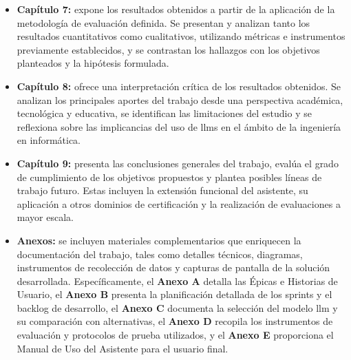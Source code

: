\begin{itemize}
\item \textbf{Capítulo 7:} expone los resultados obtenidos a partir de la aplicación de la metodología de evaluación definida. Se presentan y analizan tanto los resultados cuantitativos como cualitativos, utilizando métricas e instrumentos previamente establecidos, y se contrastan los hallazgos con los objetivos planteados y la hipótesis formulada.
\item \textbf{Capítulo 8:} ofrece una interpretación crítica de los resultados obtenidos. Se analizan los principales aportes del trabajo desde una perspectiva académica, tecnológica y educativa, se identifican las limitaciones del estudio y se reflexiona sobre las implicancias del uso de \glspl{llm} en el ámbito de la ingeniería en informática.
\item \textbf{Capítulo 9:} presenta las conclusiones generales del trabajo, evalúa el grado de cumplimiento de los objetivos propuestos y plantea posibles líneas de trabajo futuro. Estas incluyen la extensión funcional del asistente, su aplicación a otros dominios de certificación y la realización de evaluaciones a mayor escala.
\item \textbf{Anexos:} se incluyen materiales complementarios que enriquecen la documentación del trabajo, tales como detalles técnicos, diagramas, instrumentos de recolección de datos y capturas de pantalla de la solución desarrollada. Específicamente, el \textbf{Anexo A} detalla las Épicas e Historias de Usuario, el \textbf{Anexo B} presenta la planificación detallada de los sprints y el backlog de desarrollo, el \textbf{Anexo C} documenta la selección del modelo \gls{llm} y su comparación con alternativas, el \textbf{Anexo D} recopila los instrumentos de evaluación y protocolos de prueba utilizados, y el \textbf{Anexo E} proporciona el Manual de Uso del Asistente para el usuario final.
\end{itemize}
